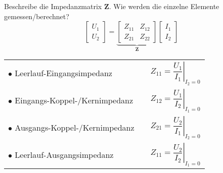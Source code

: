 
\begin{karte}{Beschreibe die Impedanzmatrix $\mathbf{Z}$. Wie werden die einzelne Elemente gemessen/berechnet?\\
	\begin{equation*}
		\left[\begin{array}{c}
		U_1 \\ U_2
		\end{array}\right]
		= 
		\underbrace{\left[\begin{array}{cc}
			Z_{11} & Z_{12}\\
			Z_{21} & Z_{22}
		\end{array}\right]}_{\mathbf{Z}}
		\left[\begin{array}{c}
		I_1 \\ I_2
		\end{array}\right]
	\end{equation*}}
	\renewcommand*{\arraystretch}{2.2}
	\begin{tabular}{lcc}	
		$\bullet$ Leerlauf-Eingangsimpedanz & \qquad & $Z_{11} = \left.\dfrac{U_1}{I_1}\right|_{I_2=0}$\\
		$\bullet$ Eingangs-Koppel-/Kernimpedanz & \qquad & $Z_{12} = \left.\dfrac{U_1}{I_2}\right|_{I_1=0}$\\
		$\bullet$ Ausgangs-Koppel-/Kernimpedanz & \qquad & $Z_{21} = \left.\dfrac{U_2}{I_1}\right|_{I_2=0}$\\
		$\bullet$ Leerlauf-Ausgangsimpedanz & \qquad & $Z_{11} = \left.\dfrac{U_2}{I_2}\right|_{I_1=0}$\\
	\end{tabular}
\end{karte}

